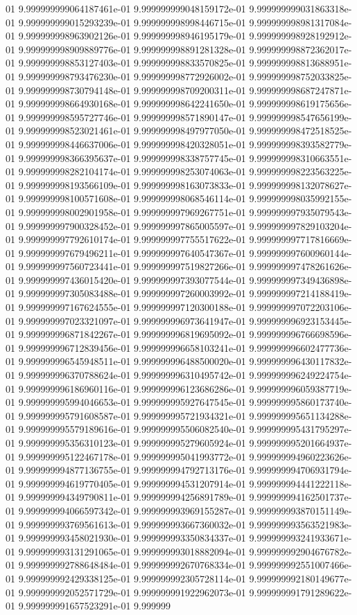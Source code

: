 01	9.999999999064187461e-01	9.999999999048159172e-01	9.999999999031863318e-01	9.999999999015293239e-01	9.999999998998446715e-01	9.999999998981317084e-01	9.999999998963902126e-01	9.999999998946195179e-01	9.999999998928192912e-01	9.999999998909889776e-01	9.999999998891281328e-01	9.999999998872362017e-01	9.999999998853127403e-01	9.999999998833570825e-01	9.999999998813688951e-01	9.999999998793476230e-01	9.999999998772926002e-01	9.999999998752033825e-01	9.999999998730794148e-01	9.999999998709200311e-01	9.999999998687247871e-01	9.999999998664930168e-01	9.999999998642241650e-01	9.999999998619175656e-01	9.999999998595727746e-01	9.999999998571890147e-01	9.999999998547656199e-01	9.999999998523021461e-01	9.999999998497977050e-01	9.999999998472518525e-01	9.999999998446637006e-01	9.999999998420328051e-01	9.999999998393582779e-01	9.999999998366395637e-01	9.999999998338757745e-01	9.999999998310663551e-01	9.999999998282104174e-01	9.999999998253074063e-01	9.999999998223563225e-01	9.999999998193566109e-01	9.999999998163073833e-01	9.999999998132078627e-01	9.999999998100571608e-01	9.999999998068546114e-01	9.999999998035992155e-01	9.999999998002901958e-01	9.999999997969267751e-01	9.999999997935079543e-01	9.999999997900328452e-01	9.999999997865005597e-01	9.999999997829103204e-01	9.999999997792610174e-01	9.999999997755517622e-01	9.999999997717816669e-01	9.999999997679496211e-01	9.999999997640547367e-01	9.999999997600960144e-01	9.999999997560723441e-01	9.999999997519827266e-01	9.999999997478261626e-01	9.999999997436015420e-01	9.999999997393077544e-01	9.999999997349436898e-01	9.999999997305083488e-01	9.999999997260003992e-01	9.999999997214188419e-01	9.999999997167624555e-01	9.999999997120300188e-01	9.999999997072203106e-01	9.999999997023321097e-01	9.999999996973641947e-01	9.999999996923153445e-01	9.999999996871842267e-01	9.999999996819695092e-01	9.999999996766698596e-01	9.999999996712839456e-01	9.999999996658103241e-01	9.999999996602477736e-01	9.999999996545948511e-01	9.999999996488500020e-01	9.999999996430117832e-01	9.999999996370788624e-01	9.999999996310495742e-01	9.999999996249224754e-01	9.999999996186960116e-01	9.999999996123686286e-01	9.999999996059387719e-01	9.999999995994046653e-01	9.999999995927647545e-01	9.999999995860173740e-01	9.999999995791608587e-01	9.999999995721934321e-01	9.999999995651134288e-01	9.999999995579189616e-01	9.999999995506082540e-01	9.999999995431795297e-01	9.999999995356310123e-01	9.999999995279605924e-01	9.999999995201664937e-01	9.999999995122467178e-01	9.999999995041993772e-01	9.999999994960223626e-01	9.999999994877136755e-01	9.999999994792713176e-01	9.999999994706931794e-01	9.999999994619770405e-01	9.999999994531207914e-01	9.999999994441222118e-01	9.999999994349790811e-01	9.999999994256891789e-01	9.999999994162501737e-01	9.999999994066597342e-01	9.999999993969155287e-01	9.999999993870151149e-01	9.999999993769561613e-01	9.999999993667360032e-01	9.999999993563521983e-01	9.999999993458021930e-01	9.999999993350834337e-01	9.999999993241933671e-01	9.999999993131291065e-01	9.999999993018882094e-01	9.999999992904676782e-01	9.999999992788648484e-01	9.999999992670768334e-01	9.999999992551007466e-01	9.999999992429338125e-01	9.999999992305728114e-01	9.999999992180149677e-01	9.999999992052571729e-01	9.999999991922962073e-01	9.999999991791289622e-01	9.999999991657523291e-01	9.999999
